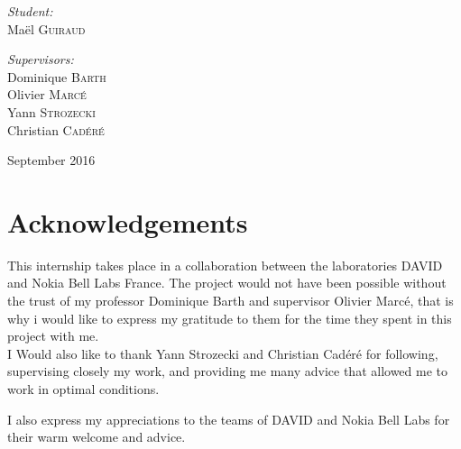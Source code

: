 \documentclass[a4paper,10pt]{report}
\newcommand{\reportauthor}{Maël \textsc{Guiraud }} %
\begin{document}
\begin{titlepage}
\begin{center}
\begin{minipage}[t]{0.3\textwidth}
  \begin{flushleft} \large
    \emph{Student:}\\
    \reportauthor 
  \end{flushleft}
\end{minipage}
\begin{minipage}[t]{0.6\textwidth}
  \begin{flushright} \large
    \emph{Supervisors:} \\
    Dominique \textsc{Barth} \\
    Olivier \textsc{Marcé} \\
    Yann \textsc{Strozecki} \\
    Christian \textsc{Cadéré} \\

  \end{flushright}
\end{minipage}

\vfill

{\large September 2016}

\end{center}

\end{titlepage}

\newpage
\null
\newpage

\section*{Acknowledgements}
This internship takes place in a collaboration between the laboratories DAVID and Nokia Bell Labs France.
The project would not have been possible without the trust of my professor Dominique Barth and supervisor Olivier Marcé, that is why i would like to express my gratitude to them for the time they spent in this project with me.\\

I Would also like to thank Yann Strozecki and Christian Cadéré for following, supervising closely my work, and providing me many advice that allowed me to work in optimal conditions.

I also express my appreciations to the teams of DAVID and Nokia Bell Labs for their warm welcome and advice.
\tableofcontents
\end{document}
